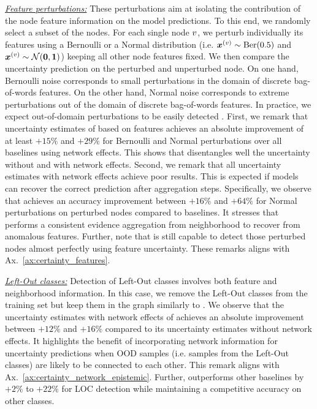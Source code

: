 \textit{\underline{Feature perturbations:}} These perturbations aim at isolating the contribution of the node feature information on the model predictions. To this end, we randomly select a subset of the nodes. For each single node $v$, we perturb individually its features using a Bernoulli or a Normal distribution (i.e. $\bm{x}^{(v)} \sim \operatorname{Ber}(0.5)$ and $\bm{x}^{(v)} \sim \operatorname{\mathcal{N}}(\bm{0}, \bm{1})$) keeping all other node features fixed. We then compare the uncertainty prediction on the perturbed and unperturbed node. On one hand, Bernoulli noise corresponds to small perturbations in the domain of discrete bag-of-words features. On the other hand, Normal noise corresponds to extreme perturbations out of the domain of discrete bag-of-words features. In practice, we expect out-of-domain perturbations to be easily detected \citep{Charpentier2020}. First, we remark that uncertainty estimates of \oursacro{} based on features achieves an absolute improvement of at least $+15\%$ and $+29\%$ for Bernoulli and Normal perturbations over all baselines using network effects. This shows that \oursacro{} disentangles well the uncertainty without and with network effects. Second, we remark that all uncertainty estimates with network effects achieve poor results. This is expected if models can recover the correct prediction after aggregation steps. Specifically, we observe that \oursacro{} achieves an accuracy improvement between $+16\%$ and $+64\%$ for Normal perturbations on perturbed nodes compared to baselines. It stresses that \oursacro{} performs a consistent evidence aggregation from neighborhood to recover from anomalous features. Further, note that \oursacro{} is still capable to detect those perturbed nodes almost perfectly using feature uncertainty. These remarks aligns with Ax.~\ref{ax:certainty_features}. 


\textit{\underline{Left-Out classes:}} Detection of Left-Out classes involves both feature and neighborhood information. In this case, we remove the Left-Out classes from the training set but keep them in the graph similarly to \citep{Zhao2020}. We observe that the uncertainty estimates with network effects of \oursacro{} achieves an absolute improvement between $+12\%$ and $+16\%$ compared to its uncertainty estimates without network effects. It highlights the benefit of incorporating network information for uncertainty predictions when OOD samples (i.e. samples from the Left-Out classes) are likely to be connected to each other. This remark aligns with Ax.~\ref{ax:certainty_network_epistemic}. Further, \oursacro{} outperforms other baselines by $+2\%$ to $+22\%$ for LOC detection while maintaining a competitive accuracy on other classes.

